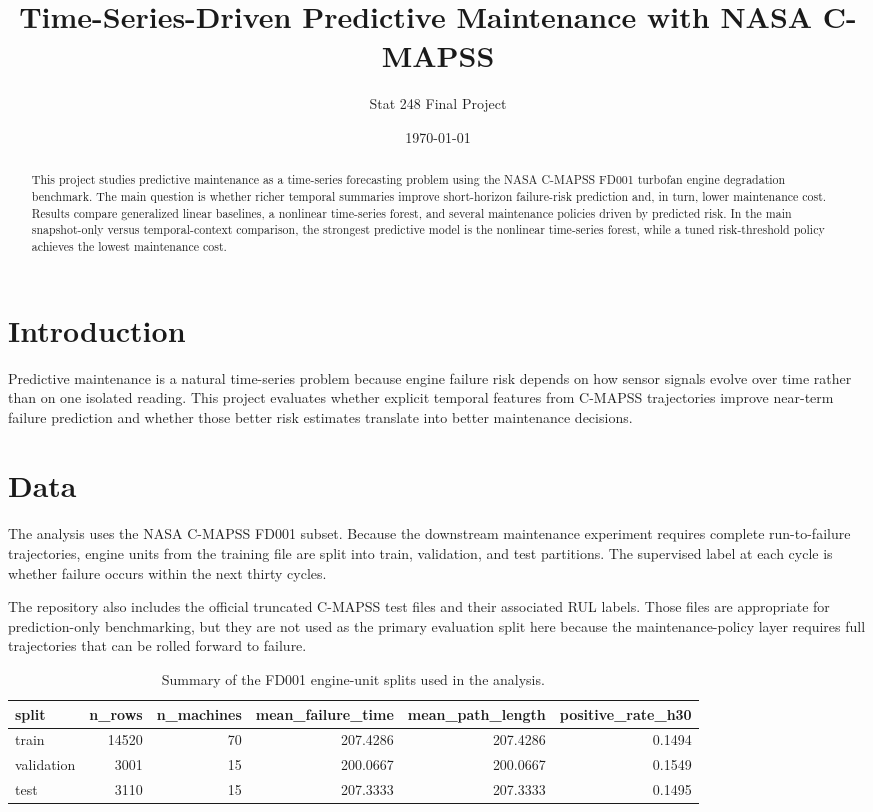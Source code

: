 \documentclass[11pt]{article}
\title{Time-Series-Driven Predictive Maintenance with NASA C-MAPSS}
\author{Stat 248 Final Project}
\date{\today}
\begin{document}
\maketitle

\begin{abstract}
This project studies predictive maintenance as a time-series forecasting problem using the NASA C-MAPSS FD001 turbofan engine degradation benchmark. The main question is whether richer temporal summaries improve short-horizon failure-risk prediction and, in turn, lower maintenance cost. Results compare generalized linear baselines, a nonlinear time-series forest, and several maintenance policies driven by predicted risk. In the main snapshot-only versus temporal-context comparison, the strongest predictive model is the nonlinear time-series forest, while a tuned risk-threshold policy achieves the lowest maintenance cost.
\end{abstract}

\section{Introduction}
Predictive maintenance is a natural time-series problem because engine failure risk depends on how sensor signals evolve over time rather than on one isolated reading. This project evaluates whether explicit temporal features from C-MAPSS trajectories improve near-term failure prediction and whether those better risk estimates translate into better maintenance decisions.

\section{Data}
The analysis uses the NASA C-MAPSS FD001 subset. Because the downstream maintenance experiment requires complete run-to-failure trajectories, engine units from the training file are split into train, validation, and test partitions. The supervised label at each cycle is whether failure occurs within the next thirty cycles.

The repository also includes the official truncated C-MAPSS test files and their associated RUL labels. Those files are appropriate for prediction-only benchmarking, but they are not used as the primary evaluation split here because the maintenance-policy layer requires full trajectories that can be rolled forward to failure.

\begin{table}[H]
\centering
\caption{Summary of the FD001 engine-unit splits used in the analysis.}
\label{tab:data-summary}
\small
\begin{tabular}{lrrrrr}
\toprule
split & n\_rows & n\_machines & mean\_failure\_time & mean\_path\_length & positive\_rate\_h30 \\
\midrule
train & 14520 & 70 & 207.4286 & 207.4286 & 0.1494 \\
validation & 3001 & 15 & 200.0667 & 200.0667 & 0.1549 \\
test & 3110 & 15 & 207.3333 & 207.3333 & 0.1495 \\
\bottomrule
\end{tabular}
\end{table}
\end{document}
